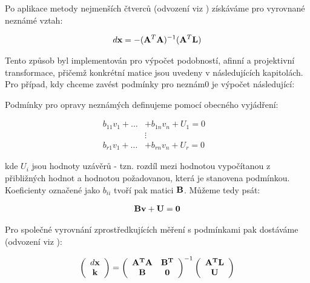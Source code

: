 Po aplikace metody nejmenších čtverců (odvození viz \cite{vyrovnani}) získáváme
pro vyrovnané neznámé vztah:

\begin{eqnarray} \label{ata}
 d{\bf x} = -({\bf A}^T {\bf A} )^{-1}({\bf A}^T {\bf L}) 
\end{eqnarray}

Tento způsob byl implementován pro výpočet podobností, afinní a projektivní
transformace, přičemž konkrétní matice jsou uvedeny v následujících kapitolách.
Pro případ, kdy chceme zavést podmínky pro neznám0 je výpočet následující:

Podmínky pro opravy neznámých definujeme pomocí obecného vyjádření:

\begin{eqnarray} \label{podminky}
b_{11} v_1 + \ldots &+ b_{1n} v_n + U_1=0 \\\nonumber
& \vdots &\\
b_{r1} v_1 + \ldots &+ b_{rn} v_n + U_r=0 \nonumber
\end{eqnarray}

kde $U_{i}$ jsou hodnoty uzávěrů - tzn. rozdíl mezi hodnotou vypočítanou z
přibližných hodnot a hodnotou požadovanou, která je stanovena podmínkou.
Koeficienty označené jako $b_{ii}$ tvoří pak matici ${\bf B}$. Můžeme tedy
psát:

\begin{eqnarray} \label{podminky} 
{\bf Bv} + \bf{U} = {\bf 0}
\end{eqnarray}

Pro společné vyrovnání zprostředkujících měření s podmínkami pak dostáváme
(odvození viz \cite{vyrovnani}):

\begin{eqnarray} \label{vyropr}
\left(
\begin{array}{c}
d{\bf x}\\
\bf k\\ 
\end{array} \right) 
=  \left( 
\begin{array}{cc}
\bf A ^T \bf A & \bf B^T \\
\bf B          & \bf 0
\end{array}\right)^{-1}
\left( 
\begin{array}{c}
\bf A ^T \bf L \\
\bf U
\end{array}\right) 
\end{eqnarray}

